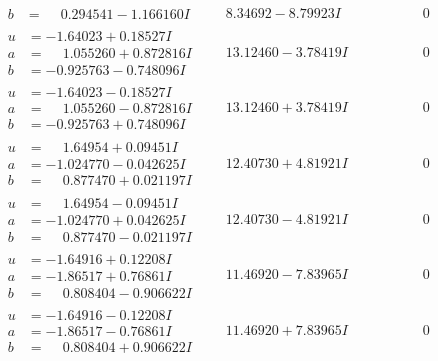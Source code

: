 \documentclass[1p]{elsarticle_modified}
\theoremstyle{definition}
\begin{document}
$$\begin{array}{c|c|c}
\begin{aligned}
b &= \phantom{-}0.294541 - 1.166160 I\end{aligned}
 & \phantom{-}8.34692 - 8.79923 I & \phantom{-0.000000 } 0 \\ \hline\begin{aligned}
u &= -1.64023 + 0.18527 I \\
a &= \phantom{-}1.055260 + 0.872816 I \\
b &= -0.925763 - 0.748096 I\end{aligned}
 & \phantom{-}13.12460 - 3.78419 I & \phantom{-0.000000 } 0 \\ \hline\begin{aligned}
u &= -1.64023 - 0.18527 I \\
a &= \phantom{-}1.055260 - 0.872816 I \\
b &= -0.925763 + 0.748096 I\end{aligned}
 & \phantom{-}13.12460 + 3.78419 I & \phantom{-0.000000 } 0 \\ \hline\begin{aligned}
u &= \phantom{-}1.64954 + 0.09451 I \\
a &= -1.024770 - 0.042625 I \\
b &= \phantom{-}0.877470 + 0.021197 I\end{aligned}
 & \phantom{-}12.40730 + 4.81921 I & \phantom{-0.000000 } 0 \\ \hline\begin{aligned}
u &= \phantom{-}1.64954 - 0.09451 I \\
a &= -1.024770 + 0.042625 I \\
b &= \phantom{-}0.877470 - 0.021197 I\end{aligned}
 & \phantom{-}12.40730 - 4.81921 I & \phantom{-0.000000 } 0 \\ \hline\begin{aligned}
u &= -1.64916 + 0.12208 I \\
a &= -1.86517 + 0.76861 I \\
b &= \phantom{-}0.808404 - 0.906622 I\end{aligned}
 & \phantom{-}11.46920 - 7.83965 I & \phantom{-0.000000 } 0 \\ \hline\begin{aligned}
u &= -1.64916 - 0.12208 I \\
a &= -1.86517 - 0.76861 I \\
b &= \phantom{-}0.808404 + 0.906622 I\end{aligned}
 & \phantom{-}11.46920 + 7.83965 I & \phantom{-0.000000 } 0 \\ \hline\begin{aligned}

\end{aligned}
\end{array}$$
\end{document}
